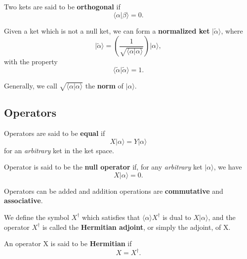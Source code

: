 \documentclass[11pt]{elegantbook}
\begin{document}
\begin{definition}[Orthogonal]
  Two kets are said to be \textbf{orthogonal} if 
  \begin{equation}
    \langle\alpha\vert\beta\rangle = 0.
  \end{equation}
\end{definition}

\begin{definition}
  Given a ket which is not a null ket, we can form a \textbf{normalized ket} $\vert\tilde{\alpha}\rangle$, where 
  \begin{equation}
    \vert\tilde{\alpha}\rangle=(\frac{1}{\sqrt{\langle\alpha\vert\alpha\rangle}})\vert\alpha\rangle,
  \end{equation}
  with the property 
  \begin{equation}
    \langle\tilde{\alpha}\vert\tilde{\alpha}\rangle=1.
  \end{equation}

  Generally, we call $\sqrt{\langle\alpha\vert\alpha\rangle}$ the \textbf{norm} of $\vert\alpha\rangle$.
\end{definition}

\subsection{Operators}

\begin{definition}
  Operators are said to be \textbf{equal} if 
  \begin{equation}
    X\vert\alpha\rangle=Y\vert\alpha\rangle 
  \end{equation}
  for an \textit{arbitrary} ket in the ket space.

  Operator is said to be the \textbf{null operator} if, for any \textit{arbitrary} ket $\vert\alpha\rangle$, we have 
  \begin{equation}
    X\vert\alpha\rangle=0.
  \end{equation}
\end{definition}
Operators can be added and addition operations are \textbf{commutative} and \textbf{associative}.

\begin{definition}
  We define the symbol $X^\dagger$ which satisfies that $\langle\alpha\rangle X^\dagger$ is dual to $X\vert\alpha\rangle$, 
  and the operator $X^\dagger$ is called the \textbf{Hermitian adjoint}, or simply the adjoint, of X. 

  An operator X is said to be \textbf{Hermitian} if 
  \begin{equation}
    X=X^\dagger.
  \end{equation}
\end{definition}
\end{document}
